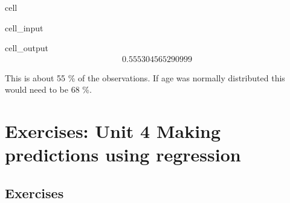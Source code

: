 \documentclass[letterpaper,10pt,english]{jupyterBook}
\begin{document}
\begin{sphinxuseclass}{cell}\begin{sphinxVerbatimInput}

\begin{sphinxuseclass}{cell_input}
\begin{sphinxVerbatim}[commandchars=\\\{\}]
\PYG{p}{[}\PYG{p}{]}\PYG{p}{[}\PYG{p}{]}
\end{sphinxVerbatim}

\end{sphinxuseclass}\end{sphinxVerbatimInput}
\begin{sphinxVerbatimOutput}

\begin{sphinxuseclass}{cell_output}\begin{equation*}
\begin{split}0.555304565290999\end{split}
\end{equation*}
\end{sphinxuseclass}\end{sphinxVerbatimOutput}

\end{sphinxuseclass}
\sphinxAtStartPar
This is about 55 \% of the observations. If age was normally distributed this would need to be 68 \%.

\sphinxstepscope


\chapter{Exercises: Unit 4 Making predictions using regression}
\label{\detokenize{exercises_unit_4:exercises-unit-4-making-predictions-using-regression}}\label{\detokenize{exercises_unit_4::doc}}

\section{Exercises}
\label{\detokenize{exercises_unit_4:exercises}}
\end{document}
